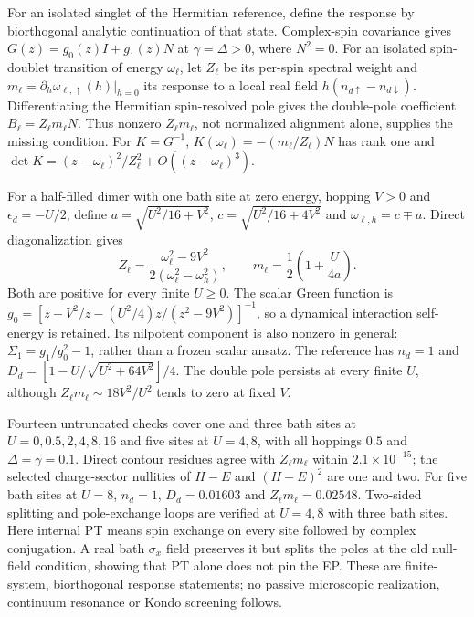 \documentclass[%
  aps,physrev,onecolumn,10pt,amsmath,amssymb,superscriptaddress,longbibliography,floatfix
]{revtex4-2}
\begin{document}
For an isolated singlet of the Hermitian reference, define the response by
biorthogonal analytic continuation of that state. Complex-spin covariance
gives $G(z)=g_0(z)I+g_1(z)N$ at $\gamma=\Delta>0$, where $N^2=0$.
For an isolated spin-doublet transition of energy $\omega_\ell$, let
$Z_\ell$ be its per-spin spectral weight and
$m_\ell=\partial_h\omega_{\ell,\uparrow}(h)|_{h=0}$ its response to a
local real field $h(n_{d\uparrow}-n_{d\downarrow})$. Differentiating the
Hermitian spin-resolved pole gives the double-pole coefficient
$B_\ell=Z_\ell m_\ell N$. Thus nonzero $Z_\ell m_\ell$, not normalized
alignment alone, supplies the missing condition. For $K=G^{-1}$,
$K(\omega_\ell)=-(m_\ell/Z_\ell)N$ has rank one and
$\det K=(z-\omega_\ell)^2/Z_\ell^2+O((z-\omega_\ell)^3)$.

For a half-filled dimer with one bath site at zero energy, hopping $V>0$
and $\epsilon_d=-U/2$, define $a=\sqrt{U^2/16+V^2}$,
$c=\sqrt{U^2/16+4V^2}$ and $\omega_{\ell,h}=c\mp a$. Direct
diagonalization gives
\begin{equation}
 Z_\ell=\frac{\omega_\ell^2-9V^2}{2(\omega_\ell^2-\omega_h^2)},
 \qquad m_\ell=\frac12\left(1+\frac{U}{4a}\right).
 \label{eq:exact_control_residue}
\end{equation}
Both are positive for every finite $U\ge0$. The scalar Green function is
$g_0=[z-V^2/z-(U^2/4)z/(z^2-9V^2)]^{-1}$, so a dynamical interaction
self-energy is retained. Its nilpotent component is also nonzero in
general: $\Sigma_1=g_1/g_0^2-1$, rather than a frozen scalar ansatz.
The reference has $n_d=1$ and
$D_d=[1-U/\sqrt{U^2+64V^2}]/4$. The double pole persists at every finite
$U$, although $Z_\ell m_\ell\sim18V^2/U^2$ tends to zero at fixed $V$.

Fourteen untruncated checks cover one and three bath sites at
$U=0,0.5,2,4,8,16$ and five sites at $U=4,8$, with all hoppings $0.5$ and
$\Delta=\gamma=0.1$. Direct contour residues agree with $Z_\ell m_\ell$
within $2.1\times10^{-15}$; the selected charge-sector nullities of $H-E$
and $(H-E)^2$ are one and two. For five bath sites at $U=8$,
$n_d=1$, $D_d=0.01603$ and $Z_\ell m_\ell=0.02548$. Two-sided splitting
and pole-exchange loops are verified at $U=4,8$ with three bath sites.
Here internal PT means spin exchange on every site followed by complex
conjugation. A real bath $\sigma_x$ field preserves it but splits the poles
at the old null-field condition, showing that PT alone does not pin the EP.
These are finite-system, biorthogonal response statements; no passive
microscopic realization, continuum resonance or Kondo screening follows.
\end{document}
